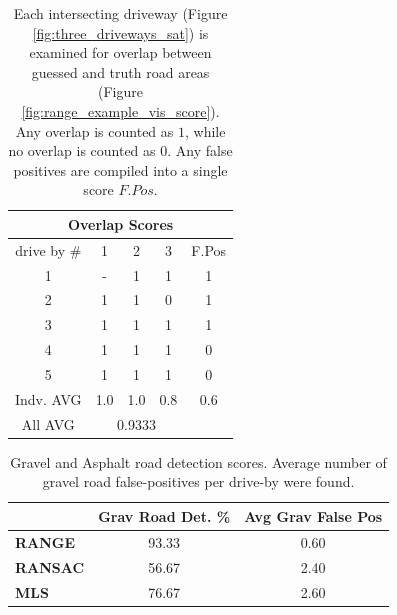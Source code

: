 \documentclass[numbered,pdftex]{ohio-etd}
\begin{document}
{{		\begin{table}[H]
			\centering
			\begin{tabular}{|llllc|}
				\hline
				\multicolumn{5}{|c|}{Overlap Scores}                                                                                  			\\ \hline
				\multicolumn{1}{|c|}{drive by \#}& \multicolumn{1}{c|}{1} 	& \multicolumn{1}{c|}{2} 	& \multicolumn{1}{c|}{3}   	& F.Pos 	\\ \hline
				\multicolumn{1}{|c|}{1}          & \multicolumn{1}{c|}{-} 	& \multicolumn{1}{c|}{1} 	& \multicolumn{1}{c|}{1}   	& 1     	\\ \hline
				\multicolumn{1}{|c|}{2}          & \multicolumn{1}{c|}{1} 	& \multicolumn{1}{c|}{1} 	& \multicolumn{1}{c|}{0}   	& 1     	\\ \hline
				\multicolumn{1}{|c|}{3}          & \multicolumn{1}{c|}{1} 	& \multicolumn{1}{c|}{1} 	& \multicolumn{1}{c|}{1}   	& 1     	\\ \hline
				\multicolumn{1}{|c|}{4}          & \multicolumn{1}{c|}{1} 	& \multicolumn{1}{c|}{1} 	& \multicolumn{1}{c|}{1}   	& 0     	\\ \hline
				\multicolumn{1}{|c|}{5}          & \multicolumn{1}{c|}{1} 	& \multicolumn{1}{c|}{1} 	& \multicolumn{1}{c|}{1}   	& 0     	\\ \hline
				\multicolumn{1}{|c|}{Indv. AVG}  & \multicolumn{1}{c|}{1.0} & \multicolumn{1}{c|}{1.0} 	& \multicolumn{1}{c|}{0.8} 	& 0.6   	\\ \hline
				\multicolumn{1}{|c|}{All AVG}    & \multicolumn{3}{c|}{0.9333}                                                   	&	\\ \hline
			\end{tabular}
			\caption[Overlap Scoring Table]{Each intersecting driveway (Figure \ref{fig:three_driveways_sat}) is examined for overlap between guessed and truth road areas (Figure \ref{fig:range_example_vis_score}). Any overlap is counted as $1$, while no overlap is counted as $0$. Any false positives are compiled into a single score $F.Pos$.}
			\label{tab:example_overlap_score}
		\end{table}
		
		\begin{table}[H]
			\centering
			\begin{tabular}{l|c|c}
									& Grav Road Det. \% 	& Avg Grav False Pos\footnotemark	\\
				\hline
				\textbf{RANGE}  	& 93.33       			& 0.60	\\[-4pt]
				\textbf{RANSAC} 	& 56.67       			& 2.40	\\[-4pt]
				\textbf{MLS}    	& 76.67 				& 2.60		
			\end{tabular}
			\caption[Road Area Detection Score]{Gravel and Asphalt road detection scores. Average number of gravel road false-positives per drive-by were found.}
			\label{tab:road_area_overlap_score}
		\end{table}
		
}}
\end{document}

